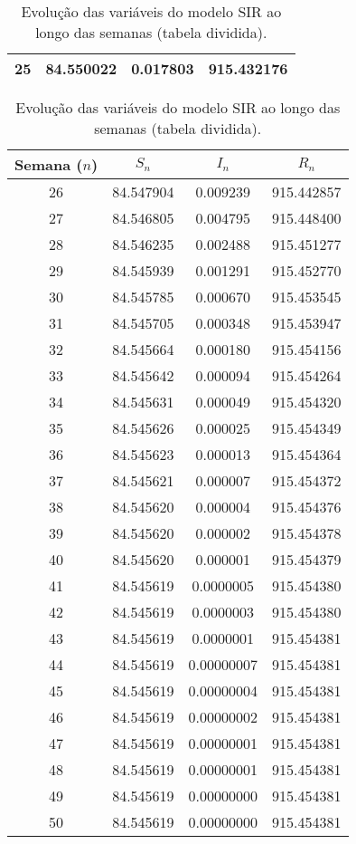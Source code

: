 \documentclass{article}
\begin{document}
\begin{table}[htpb]
\begin{minipage}{0.48\textwidth}
\begin{tabular}{|c|c|c|c|}
25 & 84.550022  & 0.017803  & 915.432176 \\ \hline
\end{tabular}
\end{minipage}%
\hfill
\begin{minipage}{0.48\textwidth}\footnotesize
\centering
\begin{tabular}{|c|c|c|c|}
\hline
\textbf{Semana ($n$)} & \textbf{$S_n$} & \textbf{$I_n$} & \textbf{$R_n$} \\ \hline
26 & 84.547904 & 0.009239 & 915.442857 \\ \hline
27 & 84.546805 & 0.004795 & 915.448400 \\ \hline
28 & 84.546235 & 0.002488 & 915.451277 \\ \hline
29 & 84.545939 & 0.001291 & 915.452770 \\ \hline
30 & 84.545785 & 0.000670 & 915.453545 \\ \hline
31 & 84.545705 & 0.000348 & 915.453947 \\ \hline
32 & 84.545664 & 0.000180 & 915.454156 \\ \hline
33 & 84.545642 & 0.000094 & 915.454264 \\ \hline
34 & 84.545631 & 0.000049 & 915.454320 \\ \hline
35 & 84.545626 & 0.000025 & 915.454349 \\ \hline
36 & 84.545623 & 0.000013 & 915.454364 \\ \hline
37 & 84.545621 & 0.000007 & 915.454372 \\ \hline
38 & 84.545620 & 0.000004 & 915.454376 \\ \hline
39 & 84.545620 & 0.000002 & 915.454378 \\ \hline
40 & 84.545620 & 0.000001 & 915.454379 \\ \hline
41 & 84.545619 & 0.0000005 & 915.454380 \\ \hline
42 & 84.545619 & 0.0000003 & 915.454380 \\ \hline
43 & 84.545619 & 0.0000001 & 915.454381 \\ \hline
44 & 84.545619 & 0.00000007 & 915.454381 \\ \hline
45 & 84.545619 & 0.00000004 & 915.454381 \\ \hline
46 & 84.545619 & 0.00000002 & 915.454381 \\ \hline
47 & 84.545619 & 0.00000001 & 915.454381 \\ \hline
48 & 84.545619 & 0.00000001 & 915.454381 \\ \hline
49 & 84.545619 & 0.00000000 & 915.454381 \\ \hline
50 & 84.545619 & 0.00000000 & 915.454381 \\ \hline
\end{tabular}
\end{minipage}
\caption{Evolução das variáveis do modelo SIR ao longo das semanas (tabela dividida).}
\end{table}
\end{document}
